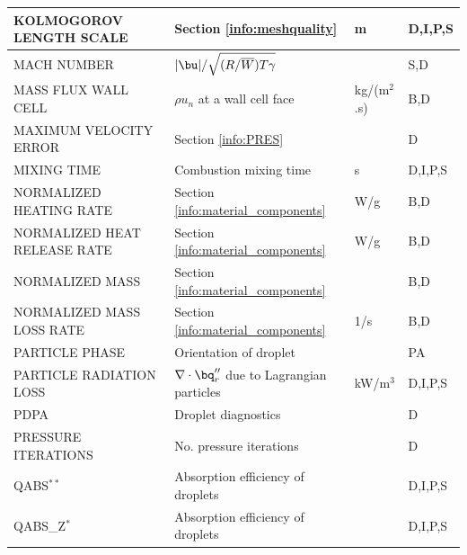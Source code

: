 \documentclass[11pt]{book}
\begin{document}
\begin{longtable}{@{\extracolsep{\fill}}|l|l|l|l|}
{\ct KOLMOGOROV LENGTH SCALE}                   & Section \ref{info:meshquality}                    & m              & D,I,P,S      \\ \hline
{\ct MACH NUMBER}                               & $|\bu|/\sqrt{(R/\overline{W}) T \gamma}$          &                & S,D          \\ \hline
{\ct MASS FLUX WALL CELL}                       & $\rho u_n$ at a wall cell face                    & \si{kg/(m$^2$.s)} & B,D       \\ \hline
{\ct MAXIMUM VELOCITY ERROR}                    & Section \ref{info:PRES}                           &                & D            \\ \hline
{\ct MIXING TIME}                               & Combustion mixing time                            & s              & D,I,P,S      \\ \hline
{\ct NORMALIZED HEATING RATE}                   & Section \ref{info:material_components}            & W/g            & B,D          \\ \hline
{\ct NORMALIZED HEAT RELEASE RATE}              & Section \ref{info:material_components}            & W/g            & B,D          \\ \hline
{\ct NORMALIZED MASS}                           & Section \ref{info:material_components}            &                & B,D          \\ \hline
{\ct NORMALIZED MASS LOSS RATE}                 & Section \ref{info:material_components}            & 1/s            & B,D          \\ \hline
{\ct PARTICLE PHASE}                            & Orientation of droplet                            &                & PA           \\ \hline
{\ct PARTICLE RADIATION LOSS}                   & $\nabla \cdot \bq_r''$ due to Lagrangian particles& kW/m$^3$       & D,I,P,S      \\ \hline
{\ct PDPA}                                      & Droplet diagnostics                               &                & D            \\ \hline
{\ct PRESSURE ITERATIONS}                       & No. pressure iterations                           &                & D            \\ \hline
{\ct QABS}$^{**}$                               & Absorption efficiency of droplets                 &                & D,I,P,S      \\ \hline
{\ct QABS\_Z}$^{*}$                             & Absorption efficiency of droplets                 &                & D,I,P,S      \\ \hline

\end{longtable}
\end{document}
